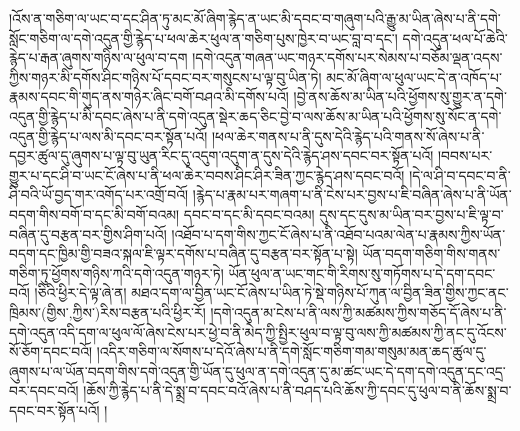 །འོས་ན་གཅིག་ལ་ཡང་བ་དང་ཤིན་ཏུ་མང་མོ་ཞིག་རྙེད་ན་ཡང་མི་དབང་བ་གཞུག་པའི་རྒྱུ་མ་ཡིན་ཞེས་པ་ནི་དགེ་སློང་གཅིག་ལ་དགེ་འདུན་གྱི་རྙེད་པ་ཕལ་ཆེར་ཕུལ་ན་གཅིག་པུས་ཁྱེར་བ་ཡང་བླ་བ་དང་། དགེ་འདུན་ཕལ་པོ་ཆེའི་རྙེད་པ་རྒན་ཞུགས་གཉིས་ལ་ཕུལ་བ་དག །དགེ་འདུན་གཞན་ཡང་གཉར་དགོས་པར་སེམས་པ་བཅོམ་ལྡན་འདས་ཀྱིས་གཉར་མི་དགོས་ཤིང་གཉིས་པོ་དབང་བར་གསུངས་པ་ལྟ་བུ་ཡིན་ཏེ། མང་མོ་ཞིག་ལ་ཕུལ་ཡང་དེ་ན་འཁོད་པ་རྣམས་དབང་གི་གུད་ནས་གཉེར་ཞིང་བགོ་བཤའ་མི་དགོས་པའོ། །བྱེ་ནས་ཆོས་མ་ཡིན་པའི་ཕྱོགས་སུ་གྱུར་ན་དགེ་འདུན་གྱི་རྙེད་པ་མི་དབང་ཞེས་པ་ནི་དགེ་འདུན་སྡེར་ཆད་ཅིང་བྱེ་བ་ལས་ཆོས་མ་ཡིན་པའི་ཕྱོགས་སུ་སོང་ན་དགེ་འདུན་གྱི་རྙེད་པ་ལས་མི་དབང་བར་སྟོན་པའོ། །ཕལ་ཆེར་གནས་པ་ནི་དུས་དེའི་རྙེད་པའི་གནས་སོ་ཞེས་པ་ནི་དབྱར་ཚུལ་དུ་ཞུགས་པ་ལྟ་བུ་ཡུན་རིང་དུ་འདུག་འདུག་ན་དུས་དེའི་རྙེད་ཤས་དབང་བར་སྟོན་པའོ། །བབས་པར་གྱུར་པ་དང་ཤི་བ་ཡང་ངོ་ཞེས་པ་ནི་ཕལ་ཆེར་བབས་ཤིང་ཤིར་ཟིན་ཀྱང་རྙེད་ཤས་དབང་བའོ། །དེ་ལ་ཤི་བ་དབང་བ་ནི་ཤི་བའི་ཡོ་བྱད་གར་འགོད་པར་འགྲོ་བའོ། །རྙེད་པ་རྣམ་པར་གཞག་པ་ནི་ངེས་པར་བྱས་པ་ཇི་བཞིན་ཞེས་པ་ནི་ཡོན་བདག་གིས་བགོ་བ་དང་མི་བགོ་བའམ། དབང་བ་དང་མི་དབང་བའམ། དུས་དང་དུས་མ་ཡིན་བར་བྱས་པ་ཇི་ལྟ་བ་བཞིན་དུ་བརྩན་བར་གྱིས་ཤིག་པའོ། །འཐོབ་པ་དག་གིས་ཀྱང་ངོ་ཞེས་པ་ནི་འཐོབ་པའམ་ལེན་པ་རྣམས་ཀྱིས་ཡོན་བདག་དང་ཁྱིམ་གྱི་བཟའ་སྐལ་ཇི་ལྟར་དགོས་པ་བཞིན་དུ་བརྩན་བར་སྟོན་པ་སྟེ། ཡོན་བདག་གཅིག་གིས་གནས་གཅིག་ཏུ་ཕྱོགས་གཉིས་ཀའི་དགེ་འདུན་གཉར་ཏེ། ཡོན་ཕུལ་ན་ཡང་གང་གི་རིགས་སུ་གཏོགས་པ་དེ་དག་དབང་བའོ། །ཅིའི་ཕྱིར་དེ་ལྟ་ཞེ་ན། མཐའ་དག་ལ་བྱིན་ཡང་ངོ་ཞེས་པ་ཡིན་ཏེ་སྡེ་གཉིས་པོ་ཀུན་ལ་བྱིན་ཟིན་གྱིས་ཀྱང་ནང་ཁྲིམས་(གྱིས་‚ཀྱིས་)རིས་བརྩན་པའི་ཕྱིར་རོ། །དགེ་འདུན་མ་ངེས་པ་ནི་ལས་ཀྱི་མཚམས་ཀྱིས་གཅོད་དོ་ཞེས་པ་ནི་དགེ་འདུན་འདི་དག་ལ་ཕུལ་ལོ་ཞེས་ངེས་པར་ཕྱེ་བ་ནི་མེད་ཀྱི་སྤྱིར་ཕུལ་བ་ལྟ་བུ་ལས་ཀྱི་མཚམས་ཀྱི་ནང་དུ་འོངས་སོ་ཅོག་དབང་བའོ། །འདིར་གཅིག་ལ་སོགས་པ་དེའོ་ཞེས་པ་ནི་དགེ་སློང་གཅིག་གམ་གསུམ་མན་ཆད་ཚུལ་དུ་ཞུགས་པ་ལ་ཡོན་བདག་གིས་དགེ་འདུན་གྱི་ཡོན་དུ་ཕུལ་ན་དགེ་འདུན་དུ་མ་ཚང་ཡང་དེ་དག་དགེ་འདུན་དང་འདྲ་བར་དབང་བའོ། །ཆོས་ཀྱི་རྙེད་པ་ནི་དེ་སྨྲ་བ་དབང་བའོ་ཞེས་པ་ནི་བཤད་པའི་ཆོས་ཀྱི་དབང་དུ་ཕུལ་བ་ནི་ཆོས་སྨྲ་བ་དབང་བར་སྟོན་པའོ། །
